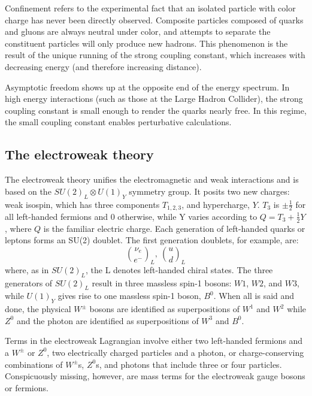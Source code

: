 Confinement refers to the experimental fact that an isolated particle with color charge has never been directly observed. Composite particles composed of quarks and gluons are always neutral under color, and attempts to separate the constituent particles will only produce new hadrons. This phenomenon is the result of the unique running of the strong coupling constant, which increases with decreasing energy (and therefore increasing distance).   

Asymptotic freedom shows up at the opposite end of the energy spectrum. In high energy interactions (such as those at the Large Hadron Collider), the strong coupling constant is small enough to render the quarks nearly free. In this regime, the small coupling constant enables perturbative calculations. 

\subsection{The electroweak theory}
The electroweak theory unifies the electromagnetic and weak interactions and is based on the $SU(2)_{L} \otimes U(1)_{Y}$ symmetry group. It posits two new charges: weak isospin, which has three components $T_{1,2,3}$, and hypercharge, $Y$. $T_{3}$ is $\pm\frac{1}{2}$ for all left-handed fermions and 0 otherwise, while Y varies according to $Q=T_{3}+\frac{1}{2}Y$, where $Q$ is the familiar electric charge. Each generation of left-handed quarks or leptons forms an SU(2) doublet. The first generation doublets, for example, are:
\begin{equation}
    \binom{\nu_{e}}{e^{-}}_{L},\ \binom{u}{d}_{L}
\end{equation}
where, as in $SU(2)_{L}$, the L denotes left-handed chiral states. The three generators of $SU(2)_{L}$ result in three massless spin-1 bosons: $W1$, $W2$, and $W3$, while $U(1)_{Y}$ gives rise to one massless spin-1 boson, $B^{0}$. When all is said and done, the physical $W^{\pm}$ bosons are identified as superpositions of $W^{1}$ and $W^{2}$ while $Z^0$ and the photon are identified as superpositions of $W^{3}$ and $B^{0}$.

Terms in the electroweak Lagrangian involve either two left-handed fermions and a $W^{\pm}$ or $Z^{0}$, two electrically charged particles and a photon, or charge-conserving combinations of $W^{\pm}$s, $Z^{0}$s, and photons that include three or four particles.  Conspicuously missing, however, are mass terms for the electroweak gauge bosons or fermions.

